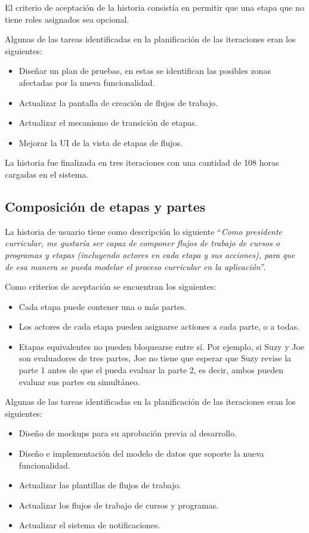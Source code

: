 El criterio de aceptación de la historia consistía en permitir que una etapa que no tiene roles asignados sea opcional.

Algunas de las tareas identificadas en la planificación de las iteraciones eran los siguientes:
\begin{itemize}
	\item Diseñar un plan de pruebas, en estas se identifican las posibles zonas afectadas por la nueva funcionalidad.
	\item Actualizar la pantalla de creación de flujos de trabajo.
	\item Actualizar el mecanismo de transición de etapas.
	\item Mejorar la UI de la vista de etapas de flujos.
\end{itemize}

La historia fue finalizada en tres iteraciones con una cantidad de 108 horas cargadas en el sistema.

\subsection{Composición de etapas y partes}
La historia de usuario tiene como descripción lo siguiente \enquote{\textit{Como presidente curricular, me gustaría ser capaz de componer flujos de trabajo de cursos o programas y etapas (incluyendo actores en cada etapa y sus acciones), para que de esa manera se pueda modelar el proceso curricular en la aplicación}}.

Como criterios de aceptación se encuentran los siguientes:
\begin{itemize}
	\item Cada etapa puede contener una o más partes.
	\item Los actores de cada etapa pueden asignarse actiones a cada parte, o a todas.
	\item Etapas equivalentes no pueden bloquearse entre sí. Por ejemplo, si Suzy y Joe son evaluadores de tres partes, Joe no tiene que esperar que Suzy revise la parte 1 antes de que el pueda evaluar la parte 2, es decir, ambos pueden evaluar sus partes en simultáneo.
\end{itemize}

Algunas de las tareas identificadas en la planificación de las iteraciones eran los siguientes:
\begin{itemize}
	\item Diseño de mockups para su aprobación previa al desarrollo.
	\item Diseño e implementación del modelo de datos que soporte la nueva funcionalidad.
	\item Actualizar las plantillas de flujos de trabajo.
	\item Actualizar los flujos de trabajo de cursos y programas.
	\item Actualizar el sistema de notificaciones.
\end{itemize}

